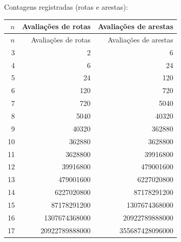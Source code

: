 \noindent Contagens registradas (rotas e arestas):
\begin{longtable}{rrr}
\toprule
$n$ & Avaliações de rotas & Avaliações de arestas \\
\midrule\endfirsthead
\toprule
$n$ & Avaliações de rotas & Avaliações de arestas \\
\midrule\endhead
3 & 2 & 6 \\
4 & 6 & 24 \\
5 & 24 & 120 \\
6 & 120 & 720 \\
7 & 720 & 5040 \\
8 & 5040 & 40320 \\
9 & 40320 & 362880 \\
10 & 362880 & 3628800 \\
11 & 3628800 & 39916800 \\
12 & 39916800 & 479001600 \\
13 & 479001600 & 6227020800 \\
14 & 6227020800 & 87178291200 \\
15 & 87178291200 & 1307674368000 \\
16 & 1307674368000 & 20922789888000 \\
17 & 20922789888000 & 355687428096000 \\
\bottomrule
\end{longtable}

